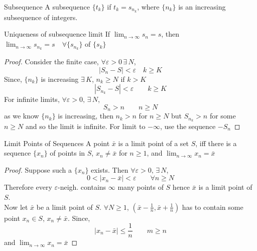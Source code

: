\documentclass{article}
\newcommand{\e}{\varepsilon}
\newcommand{\ex}{\exists\,}
\newcommand{\xb}{\bar{x}}
\begin{document}
{{{{\noindent\begin{definition}{Subsequence}{}
  A subsequence $\{ t_k \}$ if $t_k = s_{n_k}$, where $\{ n_k \}$ is an increasing subsequence of integers.
\end{definition}\vspace{10pt}

\noindent\begin{theorem}{Uniqueness of subsequence limit}{}
   If $\displaystyle{\lim_{n\to\infty}{s_n} = s}$, then $\displaystyle{\lim_{n\to\infty}{s_{n_k}} = s \quad\forall \{s_{n_k} \}}$  of $\{ s_k \}$
\end{theorem}\vspace{10pt}
\begin{proof}
  Consider the finite case, $\forall \e > 0\,\ex N$,
  $$ |S_n - S| < \e \quad k \ge K$$
  Since, $\{ n_k \}$ is increasing $\ex K$, $n_k \ge N$ if $k > K$
  $$ |S_{n_k} - S|<\e \qquad k \ge K $$
  For infinite limits, $\forall \e >0, \, \ex N$,
  $$ S_n > n \qquad n \ge N $$
  as we know $\displaystyle{\{ n_k \}}$ is increasing, then $n_k > n$ for $n \ge N$ but $S_{n_k} > n$ for some $n \ge N$ and so the limit is infinite. For limit to $-\infty$, use the sequence $-S_n$
\end{proof}

\noindent\begin{theorem}{Limit Points of Sequences}{}
  A point $\xb$ is a limit point of a set $S$, iff there is a sequence $\{ x_n \}$ of points in $S$, $x_n \neq \xb$ for $n \ge 1$, and $\displaystyle{\lim_{n\to\infty}{x_n} = \xb}$
\end{theorem}\vspace{10pt}
\begin{proof}
  Suppose such a $\{x_n\}$ exists. Then $\forall\e>0,\, \ex N$,
  $$ 0 < |x_n - \xb| < \e \qquad \forall n \ge N $$
  Therefore every $\e$-neigh. contains $\infty$ many points of $S$ hence $\xb$ is a limit point of $S$.\\

  Now let $\xb$ be a limit point of $S$. $\forall N \ge 1$, $(\xb - \frac{1}{n}, \xb + \frac{1}{n})$ has to contain some point $x_n \in S$, $x_n \neq \xb$. Since,
  $$ |x_n - \xb| \le \frac{1}{n}\qquad m \ge n $$
  and $\displaystyle{\lim_{n\to\infty}{x_n} = \xb}$
\end{proof}

}}}}
\end{document}

